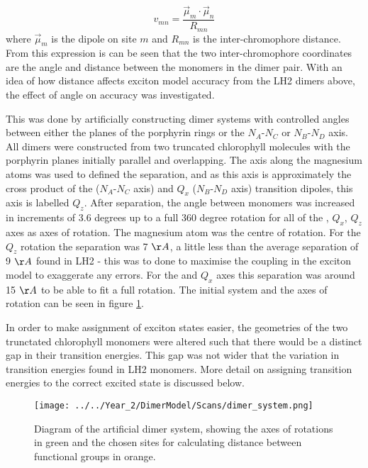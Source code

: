 \begin{equation}
    v_{mn} = \frac{\vec{\mu}_m \cdot \vec{\mu}_n}{R_{mn}}
\end{equation}
%
where $\vec{\mu}_m$ is the dipole on site $m$ and $R_{mn}$ is the inter-chromophore
distance. From this expression is can be seen that the two inter-chromophore coordinates
are the angle and distance between the monomers in the dimer pair. With an idea
of how distance affects exciton model accuracy from the LH2 dimers above, the effect 
of angle on accuracy was investigated.

This was done by artificially constructing dimer systems with controlled angles 
between either the planes of the porphyrin rings or the $N_A$-$N_C$ or $N_B$-$N_D$
axis. All dimers were constructed from two truncated chlorophyll molecules with 
the porphyrin planes initially parallel and overlapping. The axis along the magnesium
atoms was used to defined the separation, and as this axis is approximately the 
cross product of the \Qy ($N_A$-$N_C$ axis) and $Q_x$ ($N_B$-$N_D$ axis) transition
dipoles, this axis is labelled $Q_z$. After separation, the angle between monomers
was increased in increments of 3.6 degrees up to a full 360 degree rotation for 
all of the \Qy, $Q_x$, $Q_z$ axes as axes of rotation. The magnesium atom was the 
centre of rotation. For the $Q_z$ rotation the separation was 7 $\AA{}$, a little 
less than the average separation of 9 $\AA{}$ found in LH2 - this was to done to 
maximise the coupling in the exciton model to exaggerate any errors. For the \Qy
and $Q_x$ axes this separation was around 15 $\AA{}$ to be able to fit a full rotation.
The initial system and the axes of rotation can be seen in figure \ref{fig:dimer_system}.

In order to make assignment of exciton states easier, the geometries of the two 
trunctated chlorophyll monomers were altered such that there would be a distinct 
gap in their transition energies. This gap was not wider that the variation in 
transition energies found in LH2 monomers. More detail on assigning transition 
energies to the correct excited state is discussed below.

\begin{figure}
    \centering
    \texttt{[image: ../../Year\_2/DimerModel/Scans/dimer\_system.png]}
    \label{fig:dimer_system}
    \caption{Diagram of the artificial dimer system, showing the axes of rotations
    in green and the chosen sites for calculating distance between functional groups
    in orange.}
\end{figure}

